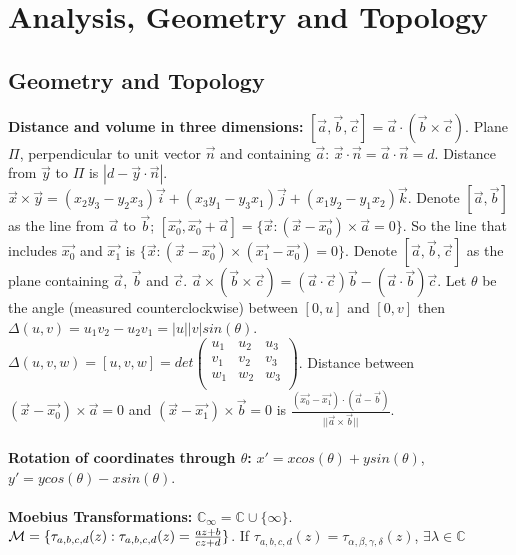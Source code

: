 \section{Analysis, Geometry and Topology}
\subsection{Geometry and Topology}
{\bf Distance and volume in three dimensions:}
$[{\vec a}, {\vec b}, {\vec c}]= {\vec a} \cdot ({\vec b} \times {\vec c})$.
Plane $\Pi$, perpendicular to unit vector ${\vec n}$ and containing ${\vec a}$:
${\vec x} \cdot {\vec n}= {\vec a} \cdot {\vec n} = d$.  Distance from ${\vec y}$ to $\Pi$ is
$| d - {\vec y} \cdot {\vec n}|$.  
${\vec x} \times {\vec y}= (x_2 y_3 - y_2 x_3) {\vec i} +
(x_3 y_1 - y_3 x_1) {\vec j} + (x_1 y_2 - y_1 x_2) {\vec k}$.
Denote $[{\vec a}, {\vec b}]$ as the line from ${\vec a}$ to ${\vec b}$;
$[{\vec {x_0}}, {\vec {x_0}} + {\vec {a}}]= 
\{ {\vec x}: ({\vec x} - {\vec {x_0}}) \times {\vec a} = 0 \}$.  So the line
that includes ${\vec {x_0}}$ and ${\vec {x_1}}$ is
$\{ {\vec x}: ({\vec x} - {\vec {x_0}}) \times ( {\vec {x_1}} - {\vec {x_0}} ) = 0 \}$.  
Denote $[{\vec a}, {\vec b}, {\vec c}]$ as the plane containing ${\vec a}$, ${\vec b}$ and
${\vec c}$. ${\vec a} \times ({\vec b} \times {\vec c})= 
({\vec a} \cdot {\vec c}) {\vec b} - ({\vec a} \cdot {\vec b}) {\vec c}$.
Let $\theta$ be the angle (measured counterclockwise) between $[0,u]$ and
$[0, v]$ then
$\Delta(u,v)= u_1 v_2 - u_2 v_1= |u| |v| sin( \theta)$.
$\Delta(u,v,w)= [u,v,w]=
det \left(
\begin{array}{ccc}
u_1 & u_2 & u_3 \\
v_1 & v_2 & v_3 \\
w_1 & w_2 & w_3 \\
\end{array}
\right)$.  Distance between
$ ({\vec x}- {\vec {x_0}}) \times {\vec a} = 0$ and
$ ({\vec x}- {\vec {x_1}}) \times {\vec b} = 0$ is
${\frac {({\vec {x_0}} - {\vec {x_1}}) \cdot ({\vec a} - {\vec b})}
{||{\vec a} \times {\vec b}||}}$.
\\
\\
{\bf Rotation of coordinates through $\theta$:}
$x' = x cos( \theta ) + y sin( \theta )$, 
$y' = y cos( \theta ) - x sin( \theta )$.
\\
\\
{\bf Moebius Transformations:} 
${\mathbb C}_{\infty}= {\mathbb C} \cup \{ \infty \}$.  ${\cal M}= \{
\tau_{a,b,c,d}(z):
\tau_{a,b,c,d}(z) = {\frac {az+b} {cz+d}}\}$.  If
$\tau_{a,b,c,d}(z)= \tau_{\alpha, \beta, \gamma, \delta}(z)$, $\exists \lambda \in {\mathbb C}$
